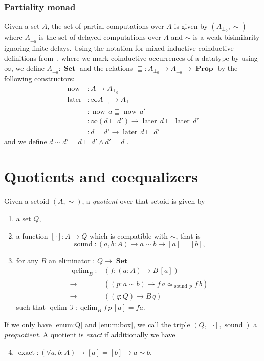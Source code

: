 \documentclass[envcountsame]{llncs}
\providecommand{\class}[1]{[#1]}
\DeclareMathOperator{\Prop}{\mathbf{Prop}}
\DeclareMathOperator{\Set}{\mathbf{Set}}
\DeclareMathOperator{\sound}{sound}
\DeclareMathOperator{\qelimbeta}{qelim-\beta}
\DeclareMathOperator{\exact}{exact}
\DeclareMathOperator{\now}{now}
\DeclareMathOperator{\later}{later}
\DeclareMathOperator{\nowequal}{now_\sqsubseteq}
\DeclareMathOperator{\laterequal}{later_\sqsubseteq}
\DeclareMathOperator{\laterleft}{later_{left}}
\DeclareMathOperator{\qelim}{qelim}
\renewcommand{\equiv}{=}
\begin{document}
\subsubsection*{Partiality monad}
Given a set $A$, the set of partial computations over $A$ is given by $(A_{\bot_0},{\sim})$ where $A_{\bot_0}$ is the set of delayed computations over $A$  and $\sim$ is a weak bisimilarity ignoring finite delays. Using the notation for mixed inductive coinductive  definitions from~\cite{danielson:altenkirch:2010}, where we mark coinductive occurrences of a datatype by using $\infty$, we define $A_{\bot_0} : \Set$ and the relations $\sqsubseteq:A_{\bot_0}\to A_{\bot_0} \to \Prop$ by the following constructors:
\begin{align*}
\now  &: A \to A_{\bot_0}\\
\later &: \infty A_{\bot_0} \to  A_{\bot_0}\\
\nowequal &: \now\, a \sqsubseteq \now\,a'\\
\laterequal &: \infty(d \sqsubseteq d') \to \later\,d \sqsubseteq \later\,d'\\
\laterleft &: d\sqsubseteq d' \to \later\,d \sqsubseteq d'
\end{align*}
and we define $d\sim d'= d\sqsubseteq d' \wedge d'\sqsubseteq d$ .

\section{Quotients and coequalizers}\label{sec:quotients}
 
\begin{definition}
\label{def:quotient}
Given a setoid $(A,\sim)$,  a \emph{quotient} over that setoid is given by

\begin{enumerate}
\item \label{enum:Q} a set $Q$,
\item \label{enum:box}a function $\class\cdot\colon A \to Q$ which is compatible with $\sim$, 
that is \[\sound\colon (a,b : A) \to a\sim b \to [a] = [b],\]
\item \label{enum:elim}   for any $B$ an eliminator : $Q\to\Set$
 \begin{align*}
 \qelim_B\colon &(f\colon (a:A) \to B\,\class a) \\
        {\to}\, &((p:a\sim b) \to f\,a \simeq_{\sound\,p}f\,b)\\
        {\to}\, &((q:Q) \to B\,q)
 \end{align*}
such that $\qelimbeta\colon \qelim_B f \,p\,\class a\equiv f a$.
 
\end{enumerate}
If we only have \ref{enum:Q} and \ref{enum:box}, we call the triple $(Q,\class\cdot, \sound)$ a \emph{prequotient}.
A quotient is \emph{exact} if additionally
we have 
\begin{enumerate}
\setcounter{enumi}{3}
\item $\exact :(\forall a,b : A) \to  \class a \equiv \class b \to a \sim b$.

\end{enumerate}
\end{definition}
\end{document}
